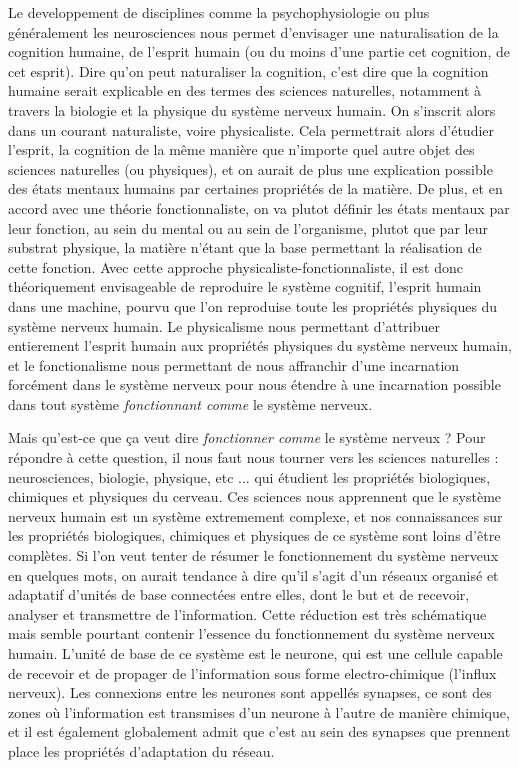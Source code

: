 \documentclass[12pt]{scrartcl}
\begin{document}
	Le developpement de disciplines comme la psychophysiologie ou plus généralement les neurosciences nous permet d'envisager une naturalisation de la cognition humaine, de l'esprit humain (ou du moins d'une partie cet cognition, de cet esprit). Dire qu'on peut naturaliser la cognition, c'est dire que la cognition humaine serait explicable en des termes des sciences naturelles, notamment à travers la biologie et la physique du système nerveux humain. On s'inscrit alors dans un courant naturaliste, voire physicaliste. Cela permettrait alors d'étudier l'esprit, la cognition de la même manière que n'importe quel autre objet des sciences naturelles (ou physiques), et on aurait de plus une explication possible des états mentaux humains par certaines propriétés de la matière. De plus, et en accord avec une théorie fonctionnaliste, on va plutot définir les états mentaux par leur fonction, au sein du mental ou au sein de l'organisme, plutot que par leur substrat physique, la matière n'étant que la base permettant la réalisation de cette fonction. Avec cette approche physicaliste-fonctionnaliste, il est donc théoriquement envisageable de reproduire le système cognitif, l'esprit humain dans une machine, pourvu que l'on reproduise toute les propriétés physiques du système nerveux humain. Le physicalisme nous permettant d'attribuer entierement l'esprit humain aux propriétés physiques du système nerveux humain, et le fonctionalisme nous permettant de nous affranchir d'une incarnation forcément dans le système nerveux pour nous étendre à une incarnation possible dans tout système \textit{fonctionnant comme} le système nerveux. 
	
	Mais qu'est-ce que ça veut dire \textit{fonctionner comme} le système nerveux ? Pour répondre à cette question, il nous faut nous tourner vers les sciences naturelles : neurosciences, biologie, physique, etc ... qui étudient les propriétés biologiques, chimiques et physiques du cerveau. Ces sciences nous apprennent que le système nerveux humain est un système extremement complexe, et nos connaissances sur les propriétés biologiques, chimiques et physiques de ce système sont loins d'être complètes. Si l'on veut tenter de résumer le fonctionnement du système nerveux en quelques mots, on aurait tendance à dire qu'il s'agit d'un réseaux organisé et adaptatif d'unités de base connectées entre elles, dont le but et de recevoir, analyser et transmettre de l'information. Cette réduction est très schématique mais semble pourtant contenir l'essence du fonctionnement du système nerveux humain. L'unité de base de ce système est le neurone, qui est une cellule capable de recevoir et de propager de l'information sous forme electro-chimique (l'influx nerveux). Les connexions entre les neurones sont appellés synapses, ce sont des zones où l'information est transmises d'un neurone à l'autre de manière chimique, et il est également globalement admit que c'est au sein des synapses que prennent place les propriétés d'adaptation du réseau.
	
\end{document}
